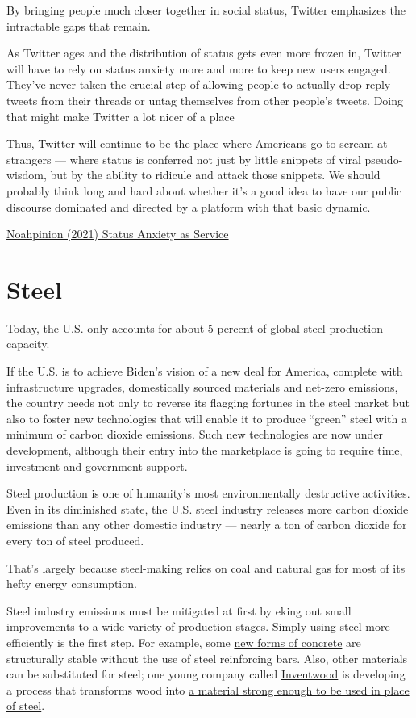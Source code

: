 \documentclass[
]{book}
\begin{document}
By bringing people much closer together in social status, Twitter emphasizes the intractable gaps that remain.

As Twitter ages and the distribution of status gets even more frozen in, Twitter will have to rely on status anxiety more and more to keep new users engaged.
They've never taken the crucial step of allowing people to actually drop reply-tweets from their threads or untag themselves from other people's tweets. Doing that might make Twitter a lot nicer of a place

Thus, Twitter will continue to be the place where Americans go to scream at strangers --- where status is conferred not just by little snippets of viral pseudo-wisdom, but by the ability to ridicule and attack those snippets. We should probably think long and hard about whether it's a good idea to have our public discourse dominated and directed by a platform with that basic dynamic.

\href{https://noahpinion.substack.com/p/status-anxiety-as-a-service}{Noahpinion (2021) Status Anxiety as Service}

\hypertarget{steel}{%
\chapter{Steel}\label{steel}}

Today, the U.S. only accounts for about 5 percent of global steel production capacity.

If the U.S. is to achieve Biden's vision of a new deal for America, complete with infrastructure upgrades, domestically sourced materials and net-zero emissions, the country needs not only to reverse its flagging fortunes in the steel market but also to foster new technologies that will enable it to produce ``green'' steel with a minimum of carbon dioxide emissions. Such new technologies are now under development, although their entry into the marketplace is going to require time, investment and government support.

Steel production is one of humanity's most environmentally destructive activities. Even in its diminished state, the U.S. steel industry releases more carbon dioxide emissions than any other domestic industry --- nearly a ton of carbon dioxide for every ton of steel produced.

That's largely because steel-making relies on coal and natural gas for most of its hefty energy consumption.

Steel industry emissions must be mitigated at first by eking out small improvements to a wide variety of production stages. Simply using steel more efficiently is the first step. For example,
some \href{https://energycentral.com/c/ec/new-innovation-drives-down-carbon-dioxide-emissions-cement}{new forms of concrete} are structurally stable without the use of steel reinforcing bars. Also, other materials can be substituted for steel;
one young company called \href{https://www.inventwood.com/}{Inventwood} is developing a process that transforms wood into \href{https://www.inventwood.com/mettlewood/}{a material strong enough to be used in place of steel}.
\end{document}

